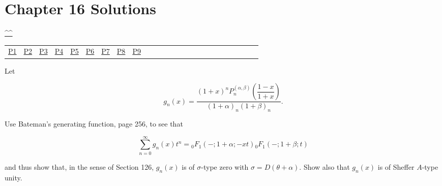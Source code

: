 \section{Chapter 16 Solutions}
\begin{center}\hyperref[toc]{\^{}\^{}}\end{center}
\begin{center}\begin{tabular}{lllllllllllllllllllllllll}
\hyperref[problem1chapter16]{P1} & \hyperref[problem2chapter16]{P2} & \hyperref[problem3chapter16]{P3} & \hyperref[problem4chapter16]{P4} & \hyperref[problem5chapter16]{P5} & \hyperref[problem6chapter16]{P6} & \hyperref[problem7chapter16]{P7} & \hyperref[problem8chapter16]{P8} & \hyperref[problem9chapter16]{P9}
\end{tabular}\end{center}
\setcounter{problem}{0}
\setcounter{solution}{0}
\begin{problem}\label{problem1chapter16}
Let

$$g_n(x) = \dfrac{(1+x)^n P_n^{(\alpha,\beta)} \left( \dfrac{1-x}{1+x} \right)}{(1+\alpha)_n (1+\beta)_n}.$$

Use Bateman's generating function, page 256, to see that

$$\displaystyle\sum_{n=0}^{\infty} g_n(x) t^n = {}_0F_1(-;1+\alpha;-xt) {}_0F_1(-;1+\beta;t)$$

and thus show that, in the sense of Section 126, $g_n(x)$ is of $\sigma$-type zero with $\sigma=D(\theta+\alpha).$ Show also that $g_n(x)$ is of Sheffer $A$-type unity.
\end{problem}
